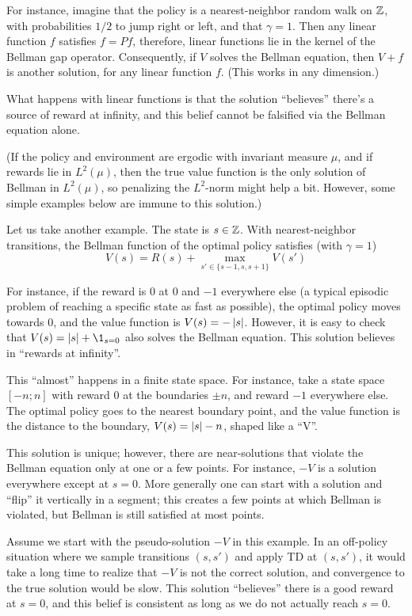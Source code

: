 \documentclass[11pt,a4paper]{article}
\begin{document}
For instance, imagine that the policy is a nearest-neighbor random walk
on ${\mathbb{Z}}$, with probabilities $1/2$ to jump right or left, and that
$\gamma=1$. Then any linear function $f$ satisfies $f=Pf$, therefore,
linear functions lie in the kernel of the Bellman gap operator.
Consequently, if $V$ solves the Bellman equation, then $V+f$ is another
solution, for any linear function $f$. (This works in any dimension.)

What happens with linear functions is that the solution ``believes''
there's a source of reward at infinity, and this belief cannot be
falsified via the Bellman equation alone.

(If the policy and environment are ergodic with invariant measure $\mu$,
and if rewards lie in $L^2(\mu)$, then the true value function is the
only solution of Bellman in $L^2(\mu)$, so penalizing the $L^2$-norm might
help a bit. However, some simple examples below are immune to this solution.)

Let us take another example. The state is $s\in {\mathbb{Z}}$. With nearest-neighbor transitions, the Bellman function of the optimal
policy satisfies (with $\gamma=1$)
\begin{equation}
\label{eq:Vopt}
V(s)=R(s)+\max_{s'\in \{s-1,s,s+1\}} V(s')
\end{equation}

For instance, if the reward is $0$ at $0$ and $-1$ everywhere else
(a typical episodic problem of reaching a specific state as fast as
possible), the
optimal policy moves towards $0$, and the value function is
$V(s)=-\left\lvert s\right\rvert$. However, it is easy to check that
$V(s)=\abs{s}+\1_{s=0}$ also solves the Bellman equation. This solution
believes in ``rewards at infinity''.

This ``almost'' happens in a finite state space. For instance, take a
state space $[-n;n]$ with reward $0$ at the boundaries $\pm n$, and
reward $-1$
everywhere else. The optimal policy goes to the nearest boundary point,
and the value function is the distance to the boundary, $V(s)=\left\lvert s\right\rvert-n$, shaped like a ``V''.

This solution is unique; however, there are near-solutions that violate
the Bellman equation only at one or a few points. For instance, $-V$ is a
solution everywhere except at $s=0$. More generally one can start with a
solution and ``flip'' it
vertically in a segment; this creates a few points at which Bellman is
violated, but Bellman is still satisfied at most points.

Assume we start with the pseudo-solution $-V$ in this example.
In an off-policy situation where we sample transitions $(s,s')$ and apply
TD at $(s,s')$, it would take a long time to realize that $-V$ is
not the correct solution, and convergence to the true solution would be
slow. This solution ``believes'' there is a good reward at $s=0$, and
this belief is consistent as long as we do not actually reach $s=0$.
\end{document}
